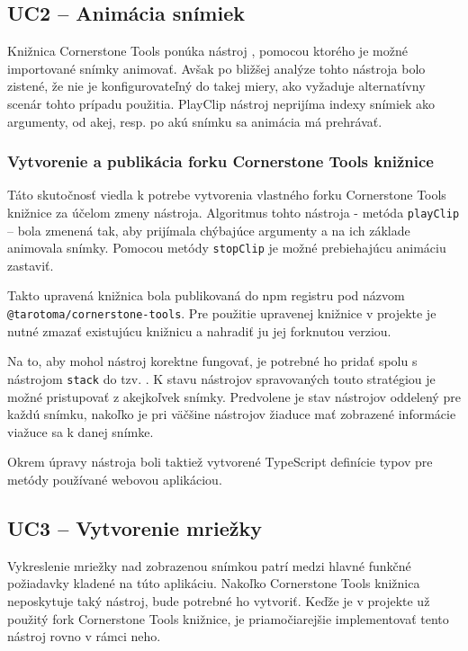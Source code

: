 \subsection {UC2 -- Animácia snímiek}
Knižnica Cornerstone Tools ponúka nástroj , pomocou ktorého je možné importované snímky animovať. Avšak po bližšej analýze tohto nástroja bolo zistené, že nie je konfigurovateľný do takej miery, ako vyžaduje alternatívny scenár tohto prípadu použitia. PlayClip nástroj neprijíma indexy snímiek ako argumenty, od akej, resp. po akú snímku sa animácia má prehrávať.

\subsubsection {Vytvorenie a publikácia forku Cornerstone Tools knižnice}
Táto skutočnosť viedla k potrebe vytvorenia vlastného forku Cornerstone Tools knižnice za účelom zmeny  nástroja. Algoritmus tohto nástroja - metóda \texttt{playClip} -- bola zmenená tak, aby prijímala chýbajúce argumenty a na ich základe animovala snímky. Pomocou metódy \texttt{stopClip} je možné prebiehajúcu animáciu zastaviť.

Takto upravená knižnica bola publikovaná do npm registru pod názvom \texttt{@tarotoma/cornerstone-tools}. Pre použitie upravenej knižnice v projekte je nutné zmazať existujúcu knižnicu a nahradiť ju jej forknutou verziou. 

Na to, aby mohol  nástroj korektne fungovať, je potrebné ho pridať spolu s nástrojom \texttt{stack} do tzv. . K stavu nástrojov spravovaných touto stratégiou je možné pristupovať z akejkoľvek snímky. Predvolene je stav nástrojov oddelený pre každú snímku, nakoľko je pri väčšine nástrojov žiaduce mať zobrazené informácie viažuce sa k danej snímke.

Okrem úpravy  nástroja boli taktiež vytvorené TypeScript definície typov pre metódy používané webovou aplikáciou.

\subsection {UC3 -- Vytvorenie mriežky}
Vykreslenie mriežky nad zobrazenou snímkou patrí medzi hlavné funkčné požiadavky kladené na túto aplikáciu. Nakoľko Cornerstone Tools knižnica neposkytuje taký nástroj, bude potrebné ho vytvoriť. Keďže je v projekte už použitý fork Cornerstone Tools knižnice, je priamočiarejšie implementovať tento nástroj rovno v rámci neho.

